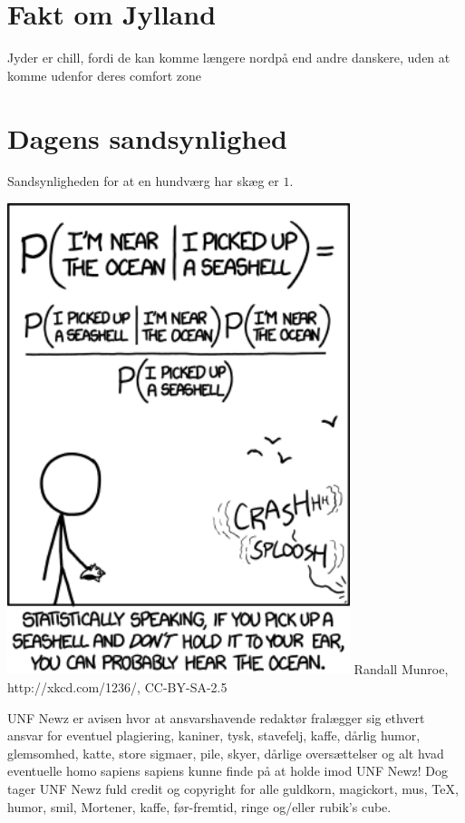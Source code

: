 \begin{minipage}[b]{0.95\linewidth}
\begin{minipage}[t]{0.47\textwidth}
\vspace{-2mm}
\section*{Fakt om Jylland}
Jyder er chill, fordi de kan komme længere nordpå end andre danskere, uden at komme udenfor deres comfort zone

\vspace{-2mm}
\section*{Dagens sandsynlighed}
Sandsynligheden for at en hundværg har skæg er $1$.

\vspace{1mm}
\includegraphics[width=100mm]{seashell.png}
\tiny Randall Munroe, http://xkcd.com/1236/, CC-BY-SA-2.5
\end{minipage}

\begin{center}
\tiny UNF Newz er avisen hvor at ansvarshavende redaktør fralægger sig ethvert ansvar for eventuel plagiering, kaniner, tysk, stavefelj, kaffe, dårlig humor, glemsomhed, katte, store sigmaer, pile, skyer, dårlige oversættelser og alt hvad eventuelle homo sapiens sapiens kunne finde på at holde imod UNF Newz! Dog tager UNF Newz fuld credit og copyright for alle guldkorn, magickort, mus, \TeX, humor, smil, Mortener, kaffe, før-fremtid, ringe og/eller rubik's cube.
\end{center}
\end{minipage}

